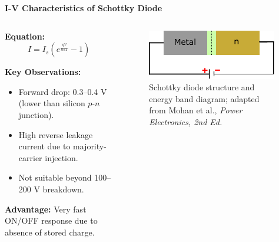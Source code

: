 \begin{frame}{\textbf{I-V Characteristics of Schottky Diode}}
    \begin{columns}
        \begin{column}{0.6\textwidth}
        \textbf{Equation:}
        \begin{equation}
        I = I_s \left( e^{\frac{qV}{nkT}} - 1 \right)
        \end{equation}
        
        \textbf{Key Observations:}
        \begin{itemize}
            \item Forward drop: 0.3–0.4 V (lower than silicon $p$-$n$ junction).
            \item High reverse leakage current due to majority-carrier injection.
            \item Not suitable beyond 100–200 V breakdown.
        \end{itemize}
        \textbf{Advantage:} Very fast ON/OFF response due to absence of stored charge.
    \end{column}
    \begin{column}{0.4\textwidth}
                \begin{figure}
                    \centering
                    \includegraphics[scale=1]{fig/lec04/schottky_diode.pdf}
                    \caption{Schottky diode structure and energy band diagram; adapted from Mohan et al., \textit{Power Electronics, 2nd Ed.}}
                    \label{fig:schottky_diode_structure}
                \end{figure}
    \end{column}
\end{columns}

\end{frame}
    
